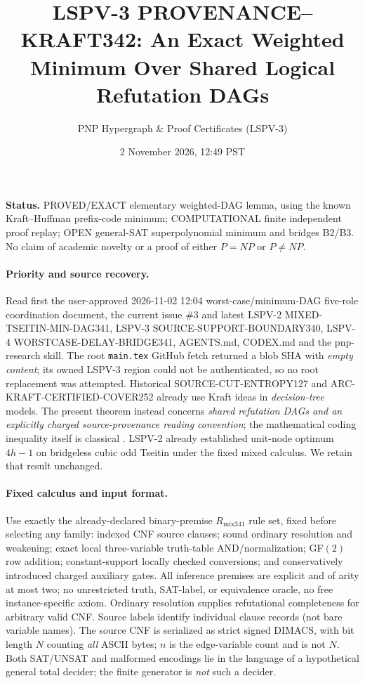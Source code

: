 \documentclass[11pt]{article}
\title{LSPV-3 PROVENANCE--KRAFT342: An Exact Weighted Minimum Over Shared Logical Refutation DAGs}
\author{PNP Hypergraph \& Proof Certificates (LSPV-3)}
\date{2 November 2026, 12:49 PST}
\begin{document}
\maketitle
\noindent\textbf{Status.} PROVED/EXACT elementary weighted-DAG lemma, using the known Kraft--Huffman prefix-code minimum; COMPUTATIONAL finite independent proof replay; OPEN general-SAT superpolynomial minimum and bridges B2/B3. No claim of academic novelty or a proof of either $P=NP$ or $P\ne NP$.

\paragraph{Priority and source recovery.}
Read first the user-approved 2026-11-02 12:04 worst-case/minimum-DAG five-role coordination document, the current issue \#3 and latest LSPV-2 MIXED-TSEITIN-MIN-DAG341, LSPV-3 SOURCE-SUPPORT-BOUNDARY340, LSPV-4 WORSTCASE-DELAY-BRIDGE341, AGENTS.md, CODEX.md and the pnp-research skill. The root \texttt{main.tex} GitHub fetch returned a blob SHA with \emph{empty content}; its owned LSPV-3 region could not be authenticated, so no root replacement was attempted. Historical SOURCE-CUT-ENTROPY127 and ARC-KRAFT-CERTIFIED-COVER252 already use Kraft ideas in \emph{decision-tree} models. The present theorem instead concerns \emph{shared refutation DAGs and an explicitly charged source-provenance reading convention}; the mathematical coding inequality itself is classical \cite{Huffman1952}. LSPV-2 already established unit-node optimum $4h-1$ on bridgeless cubic odd Tseitin under the fixed mixed calculus. We retain that result unchanged.

\paragraph{Fixed calculus and input format.}
Use exactly the already-declared binary-premise $R_{\mathrm{mix341}}$ rule set, fixed before selecting any family: indexed CNF source clauses; sound ordinary resolution and weakening; exact local three-variable truth-table AND/normalization; GF$(2)$ row addition; constant-support locally checked conversions; and conservatively introduced charged auxiliary gates. All inference premises are explicit and of arity at most two; no unrestricted truth, SAT-label, or equivalence oracle, no free instance-specific axiom. Ordinary resolution supplies refutational completeness for arbitrary valid CNF. Source labels identify individual clause records (not bare variable names). The source CNF is serialized as strict signed DIMACS, with bit length $N$ counting \emph{all} ASCII bytes; $n$ is the edge-variable count and is not $N$. Both SAT/UNSAT and malformed encodings lie in the language of a hypothetical general total decider; the finite generator is \emph{not} such a decider.
\end{document}
